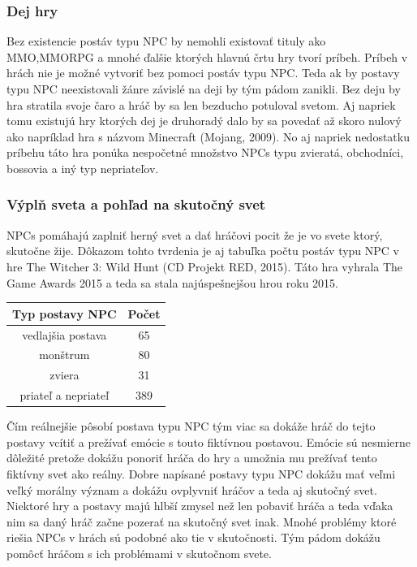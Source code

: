 \documentclass[10pt,twoside,slovak,a4paper]{article}
\begin{document}
\subsubsection{Dej hry}
Bez existencie postáv typu NPC by nemohli existovať tituly ako MMO,MMORPG a mnohé ďalšie 
ktorých hlavnú črtu hry tvorí príbeh. Príbeh v hrách nie je možné vytvoriť bez pomoci postáv typu NPC. 
Teda ak by postavy typu NPC neexistovali žánre závislé na deji by tým pádom zanikli. 
Bez deju by hra stratila svoje čaro a hráč by sa len bezducho potuloval svetom. Aj napriek tomu 
existujú hry ktorých dej je druhoradý dalo by sa povedať až skoro nulový ako 
napríklad hra s názvom Minecraft (Mojang, 2009). No aj napriek nedostatku príbehu 
táto hra ponúka nespočetné množstvo NPCs typu zvieratá, obchodníci, bossovia a iný typ nepriateľov.

\subsubsection{Výplň sveta a pohľad na skutočný svet}
NPCs pomáhajú zaplniť herný svet a dať hráčovi pocit že je vo svete ktorý,
skutočne žije. Dôkazom tohto tvrdenia je aj tabuľka počtu postáv typu NPC v hre The Witcher 3: Wild Hunt (CD Projekt RED, 2015). Táto hra vyhrala The Game Awards 2015 a teda sa stala najúspešnejšou hrou roku 2015. 


\begin{center}

\hfill \break
    
\begin{tabular}{|c|c|}
    
     \hline
     Typ postavy NPC & Počet\\
     \hline
     vedlajšia postava & 65\\
    \hline
    monštrum & 80\\
    \hline
    zviera & 31\\
    \hline
    priateľ a nepriateľ &389\\
    \hline

\end{tabular}

\hfill \break

\end{center}




Čím reálnejšie pôsobí postava typu NPC tým viac sa dokáže hráč do tejto postavy vcítiť a prežívať emócie s touto fiktívnou postavou. Emócie sú nesmierne dôležité pretože dokážu ponoriť hráča do hry a umožnia mu prežívať tento fiktívny svet ako reálny. Dobre napísané postavy typu NPC dokážu mať veľmi veľký morálny význam a dokážu ovplyvniť hráčov a teda aj skutočný svet. Niektoré hry a postavy majú hlbší zmysel než len pobaviť hráča a teda vďaka nim sa daný hráč začne pozerať na skutočný svet inak. Mnohé problémy ktoré riešia NPCs v hrách sú podobné ako tie v skutočnosti. Tým pádom dokážu pomôcť hráčom s ich problémami v skutočnom svete. 
\end{document}
